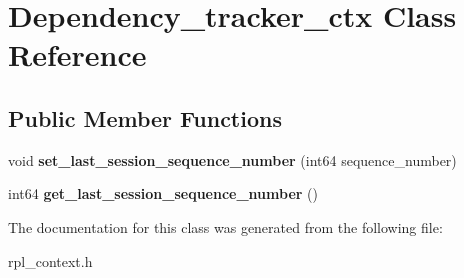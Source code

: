 \hypertarget{classDependency__tracker__ctx}{}\section{Dependency\+\_\+tracker\+\_\+ctx Class Reference}
\label{classDependency__tracker__ctx}
\subsection*{Public Member Functions}
\begin{DoxyCompactItemize}
\item 
\mbox{\label{classDependency__tracker__ctx_a0d5da6bfdff0889bd37459a2384f03f0}} 
void {\bfseries set\+\_\+last\+\_\+session\+\_\+sequence\+\_\+number} (int64 sequence\+\_\+number)
\item 
\mbox{\label{classDependency__tracker__ctx_ae2b6c8ae839d96ab745598c645109486}} 
int64 {\bfseries get\+\_\+last\+\_\+session\+\_\+sequence\+\_\+number} ()
\end{DoxyCompactItemize}


The documentation for this class was generated from the following file\+:\begin{DoxyCompactItemize}
\item 
rpl\+\_\+context.\+h\end{DoxyCompactItemize}
